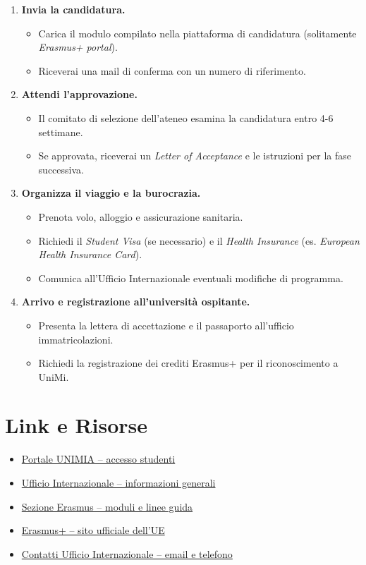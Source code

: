 \documentclass{article}
\begin{document}
\begin{enumerate}[label=\arabic*.]
\begin{itemize}
    \end{itemize}
    \item \textbf{Invia la candidatura.}  
    \begin{itemize}
        \item Carica il modulo compilato nella piattaforma di candidatura (solitamente \textit{Erasmus+ portal}).  
        \item Riceverai una mail di conferma con un numero di riferimento.
    \end{itemize}
    \item \textbf{Attendi l'approvazione.}  
    \begin{itemize}
        \item Il comitato di selezione dell'ateneo esamina la candidatura entro 4-6 settimane.  
        \item Se approvata, riceverai un \textit{Letter of Acceptance} e le istruzioni per la fase successiva.
    \end{itemize}
    \item \textbf{Organizza il viaggio e la burocrazia.}  
    \begin{itemize}
        \item Prenota volo, alloggio e assicurazione sanitaria.  
        \item Richiedi il \textit{Student Visa} (se necessario) e il \textit{Health Insurance} (es. \textit{European Health Insurance Card}).  
        \item Comunica all'Ufficio Internazionale eventuali modifiche di programma.
    \end{itemize}
    \item \textbf{Arrivo e registrazione all'università ospitante.}  
    \begin{itemize}
        \item Presenta la lettera di accettazione e il passaporto all'ufficio immatricolazioni.  
        \item Richiedi la registrazione dei crediti Erasmus+ per il riconoscimento a UniMi.
    \end{itemize}
\end{enumerate}

\section{Link e Risorse}
\begin{itemize}
    \item \href{https://unimia.unimi.it}{Portale UNIMIA – accesso studenti}  
    \item \href{https://www.unimi.it/it/ateneo/servizi/ufficio-internazionale}{Ufficio Internazionale – informazioni generali}  
    \item \href{https://www.unimi.it/it/ateneo/servizi/ufficio-internazionale/erasmus}{Sezione Erasmus – moduli e linee guida}  
    \item \href{https://erasmusplus.ec.europa.eu/}{Erasmus+ – sito ufficiale dell'UE}  
    \item \href{https://www.unimi.it/it/ateneo/servizi/ufficio-internazionale/contatti}{Contatti Ufficio Internazionale – email e telefono}  
\end{itemize}
\end{document}
